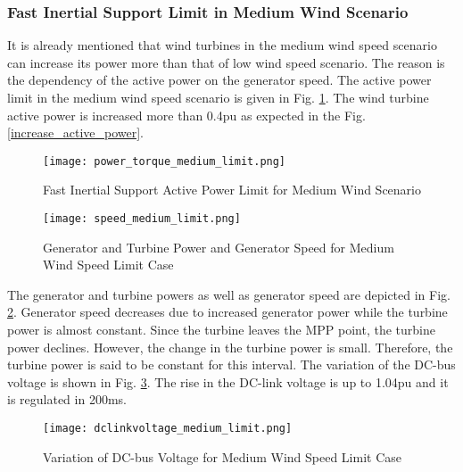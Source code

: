 \subsubsection{Fast Inertial Support Limit in Medium Wind Scenario}
It is already mentioned that wind turbines in the medium wind speed scenario can increase its power more than that of low wind speed scenario. The reason is the dependency of the active power on the generator speed. The active power limit in the medium wind speed scenario is given in Fig. \ref{medium_limit_power}. The wind turbine active power is increased more than 0.4pu as expected in the Fig. \ref{increase_active_power}.\par
\begin{figure}[h]
	\centering
	\texttt{[image: power\_torque\_medium\_limit.png]}
	\caption{Fast Inertial Support Active Power Limit for Medium Wind Scenario}
	\label{medium_limit_power}
\end{figure}
\begin{figure}[h!]
	\centering
	\texttt{[image: speed\_medium\_limit.png]}
	\caption{Generator and Turbine Power and Generator Speed for Medium Wind Speed Limit Case}
	\label{medium_limit_speed}
\end{figure}
The generator and turbine powers as well as generator speed are depicted in Fig. \ref{medium_limit_speed}. Generator speed decreases due to increased generator power while the turbine power is almost constant. Since the turbine leaves the MPP point, the turbine power declines. However, the change in the turbine power is small. Therefore, the turbine power is said to be constant for this interval. The variation of the DC-bus voltage is shown in Fig. \ref{medium_limit_dc-bus}. The rise in the DC-link voltage is up to 1.04pu and it is regulated in 200ms. 
\begin{figure}[h]
	\centering
	\texttt{[image: dclinkvoltage\_medium\_limit.png]}
	\caption{Variation of DC-bus Voltage for Medium Wind Speed Limit Case}
	\label{medium_limit_dc-bus}
\end{figure}
